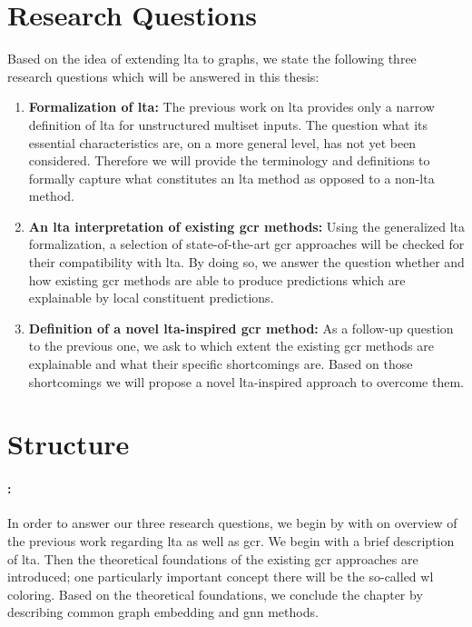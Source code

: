 \section{Research Questions}%
\label{sec:intro:questions}

Based on the idea of extending \ac{lta} to graphs, we state the following three research questions which will be answered in this thesis:
\begin{enumerate}[label=\textbf{\arabic*.}]
	\item \textbf{Formalization of \ac{lta}:}
		The previous work on \ac{lta} provides only a narrow definition of \ac{lta} for unstructured multiset inputs.
		The question what its essential characteristics are, on a more general level, has not yet been considered.
		Therefore we will provide the terminology and definitions to formally capture what constitutes an \ac{lta} method as opposed to a non-\ac{lta} method.
	\item \textbf{An \ac{lta} interpretation of existing \ac{gcr} methods:}
		Using the generalized \ac{lta} formalization, a selection of state-of-the-art \ac{gcr} approaches will be checked for their compatibility with \ac{lta}.
		By doing so, we answer the question whether and how existing \ac{gcr} methods are able to produce predictions which are explainable by local constituent predictions.
	\item \textbf{Definition of a novel \acs{lta}-inspired \ac{gcr} method:}
		As a follow-up question to the previous one, we ask to which extent the existing \ac{gcr} methods are explainable and what their specific shortcomings are.
		Based on those shortcomings we will propose a novel \acs{lta}-inspired approach to overcome them.
\end{enumerate}

\section{Structure}%
\label{sec:intro:structure}

\paragraph{: }
In order to answer our three research questions, we begin by with on overview of the previous work regarding \ac{lta} as well as \ac{gcr}.
We begin with a brief description of \ac{lta}.
Then the theoretical foundations of the existing \ac{gcr} approaches are introduced;
one particularly important concept there will be the so-called \acl*{wl} coloring.
Based on the theoretical foundations, we conclude the chapter by describing common graph embedding and \acl{gnn} methods.


